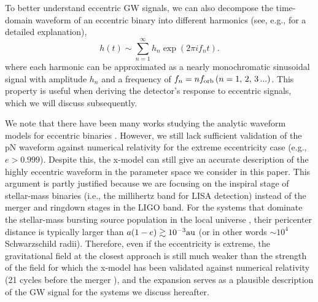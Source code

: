 \documentclass[%
 reprint,
 amsmath,amssymb,
 aps,
]{revtex4-2}
\begin{document}
To better understand eccentric GW signals, we can also decompose the time-domain waveform of an eccentric binary into different harmonics (see, e.g., \citep{peters63,oleary09,Kocsis_2012,Kocsis2012b} for a detailed explanation),
\begin{equation}
h(t) \sim \sum_{n=1}^{\infty} h_{n} \exp \left(2 \pi i f_n t\right).\label{eq:eccdecompose}
\end{equation}
where each harmonic can be approximated as a nearly monochromatic sinusoidal signal with amplitude $h_n$ and a frequency of $f_n=nf_{\rm orb}\, (n=1,\,2,\,3\,...)$. This property is useful when deriving the detector's response to eccentric signals, which we will discuss subsequently.

We note that there have been many works studying the analytic waveform models for eccentric binaries \citep[see, e.g., ][for a review]{Moore2018,Moore_2019b,Loutrel+20, Knee2022ecc}. However, we still lack sufficient validation of the pN waveform against numerical relativity for the extreme eccentricity case (e.g., $e>0.999$). Despite this, the x-model can still give an accurate description of the highly eccentric waveform in the parameter space we consider in this paper. This argument is partly justified because we are focusing on the inspiral stage of stellar-mass binaries (i.e., the millihertz band for LISA detection) instead of the merger and ringdown stages in the LIGO band. For the systems that dominate the stellar-mass bursting source population in the local universe \citep{Xuan+23b,Xuan24bkg}, their pericenter distance is typically larger than $a(1-e)\gtrsim 10^{-3}{\rm au}$ (or in other words $\sim 10^{4}$ Schwarzschild radii). Therefore, even if the eccentricity is extreme, the gravitational field at the closest approach is still much weaker than the strength of the field for which the x-model has been validated against numerical relativity (21 cycles before the merger \citep{Hinder+10}), and the expansion serves as a plausible description of the GW signal for the systems we discuss hereafter.
\end{document}
